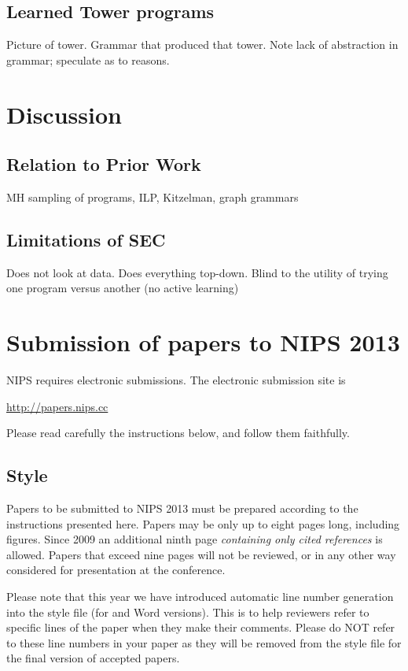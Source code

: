\documentclass{article} %
\begin{document}
\subsection{Learned Tower programs}

Picture of tower. Grammar that produced that tower. Note lack of abstraction in grammar; speculate as to reasons.

\section{Discussion}

\subsection{Relation to Prior Work}

MH sampling of programs, ILP, Kitzelman, graph grammars

\subsection{Limitations of SEC}

Does not look at data. Does everything top-down. Blind to the utility of trying one program versus another (no active learning)

\section{Submission of papers to NIPS 2013}

NIPS requires electronic submissions.  The electronic submission site is  
\begin{center}
   \url{http://papers.nips.cc}
\end{center}

Please read carefully the
instructions below, and follow them faithfully.
\subsection{Style}

Papers to be submitted to NIPS 2013 must be prepared according to the
instructions presented here. Papers may be only up to eight pages long,
including figures. Since 2009 an additional ninth page \textit{containing only
cited references} is allowed. Papers that exceed nine pages will not be
reviewed, or in any other way considered for presentation at the conference.

Please note that this year we have introduced automatic line number generation
into the style file (for \LaTeXe and Word versions). This is to help reviewers
refer to specific lines of the paper when they make their comments. Please do
NOT refer to these line numbers in your paper as they will be removed from the
style file for the final version of accepted papers.
\end{document}
